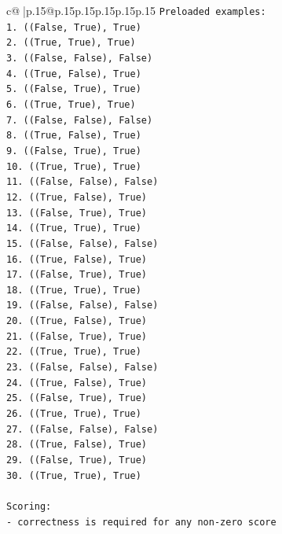 \documentclass{article}
\begin{document}
{\begin{supertabular}{c@{$\;$}|p{.15\linewidth}@{}p{.15\linewidth}p{.15\linewidth}p{.15\linewidth}p{.15\linewidth}p{.15\linewidth}}
{{{\texttt{Preloaded examples:} \\
\texttt{1. ((False, True), True)} \\
\texttt{2. ((True, True), True)} \\
\texttt{3. ((False, False), False)} \\
\texttt{4. ((True, False), True)} \\
\texttt{5. ((False, True), True)} \\
\texttt{6. ((True, True), True)} \\
\texttt{7. ((False, False), False)} \\
\texttt{8. ((True, False), True)} \\
\texttt{9. ((False, True), True)} \\
\texttt{10. ((True, True), True)} \\
\texttt{11. ((False, False), False)} \\
\texttt{12. ((True, False), True)} \\
\texttt{13. ((False, True), True)} \\
\texttt{14. ((True, True), True)} \\
\texttt{15. ((False, False), False)} \\
\texttt{16. ((True, False), True)} \\
\texttt{17. ((False, True), True)} \\
\texttt{18. ((True, True), True)} \\
\texttt{19. ((False, False), False)} \\
\texttt{20. ((True, False), True)} \\
\texttt{21. ((False, True), True)} \\
\texttt{22. ((True, True), True)} \\
\texttt{23. ((False, False), False)} \\
\texttt{24. ((True, False), True)} \\
\texttt{25. ((False, True), True)} \\
\texttt{26. ((True, True), True)} \\
\texttt{27. ((False, False), False)} \\
\texttt{28. ((True, False), True)} \\
\texttt{29. ((False, True), True)} \\
\texttt{30. ((True, True), True)} \\
\\ 
\texttt{Scoring:} \\
\texttt{{-} correctness is required for any non{-}zero score} \\
}}}
\end{supertabular}}
\end{document}
